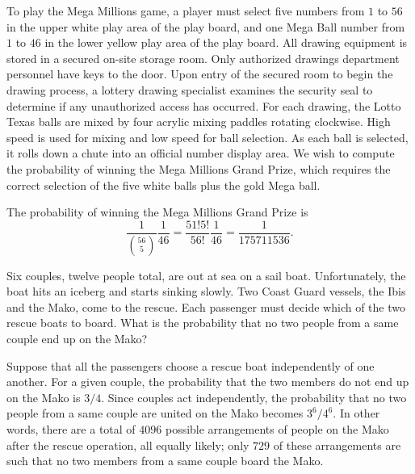 \begin{example}
To play the Mega Millions game, a player must select five numbers from $1$ to $56$ in the upper white play area of the play board, and one Mega Ball number from $1$ to $46$ in the lower yellow play area of the play board.
All drawing equipment is stored in a secured on-site storage room.
Only authorized drawings department personnel have keys to the door.
Upon entry of the secured room to begin the drawing process, a lottery drawing specialist examines the security seal to determine if any unauthorized access has occurred.
For each drawing, the Lotto Texas balls are mixed by four acrylic mixing paddles rotating clockwise.
High speed is used for mixing and low speed for ball selection.
As each ball is selected, it rolls down a chute into an official number display area.
We wish to compute the probability of winning the Mega Millions Grand Prize, which requires the correct selection of the five white balls plus the gold Mega ball.

The probability of winning the Mega Millions Grand Prize is
\begin{equation*}
\frac{1}{\binom{56}{5}} \frac{1}{46}
= \frac{51!5!}{56!} \frac{1}{46}
= \frac{1}{175 711 536} .
\end{equation*}
\end{example}

\begin{example}
Six couples, twelve people total, are out at sea on a sail boat.
Unfortunately, the boat hits an iceberg and starts sinking slowly.
Two Coast Guard vessels, the Ibis and the Mako, come to the rescue.
Each passenger must decide which of the two rescue boats to board.
What is the probability that no two people from a same couple end up on the Mako?

Suppose that all the passengers choose a rescue boat independently of one another.
For a given couple, the probability that the two members do not end up on the Mako is $3/4$.
Since couples act independently, the probability that no two people from a same couple are united on the Mako becomes $3^6/4^6$.
In other words, there are a total of $4096$ possible arrangements of people on the Mako after the rescue operation, all equally likely;
only $729$ of these arrangements are such that no two members from a same couple board the Mako.
\end{example}

